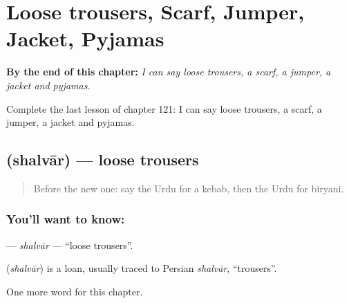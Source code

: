 
\chapter{Loose trousers, Scarf, Jumper, Jacket, Pyjamas}
\label{ch:ur-loose-trousers-scarf-jumper-jacket-pyjamas}

\begin{chapteropening}
\textbf{By the end of this chapter:} \emph{I can say loose trousers, a scarf, a jumper, a jacket and pyjamas.}

Complete the last lesson of chapter 121: I can say loose trousers, a scarf, a jumper, a jacket and pyjamas.
\end{chapteropening}

\section[\texorpdfstring{\ur{شلوار} (shalvār)}{شلوار (shalvār)}]{ (shalvār) — loose trousers}

\label{lesson:UR-C121-shalvar}



\begin{quote}
Before the new one: say the Urdu for a kebab, then the Urdu for biryani.
\end{quote}

\subsection*{You'll want to know: }
\textbf{} — \emph{shalvār} — \textquotedblleft{}loose trousers\textquotedblright{}.

\begin{cousinweb}
\textbf{} (\emph{shalvār}) is a loan, usually traced to Persian \emph{shalvār}, \textquotedblleft{}trousers\textquotedblright{}.
\end{cousinweb}

\begin{grammarlens}[title={What you've built}]
One more word for this chapter.
\end{grammarlens}

